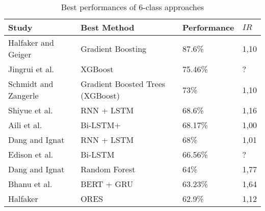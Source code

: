 \begin{table}[ht]
    \caption{Best performances of 6-class approaches}
    \label{tab:ml_performance_6class}
    \centering
    \begin{tabular}{l l l l}
        \toprule
        \textbf{Study} & \textbf{Best Method} & \textbf{Performance} & \textbf{$IR$}\\ 
        \midrule
        Halfaker and Geiger~\cite{Halfaker2020_lr1055} & Gradient Boosting & 87.6\% & 1,10 \\
        Jingrui et al.~\cite{Hou2021_lr122} & XGBoost & 75.46\% & ? \\
        Schmidt and Zangerle~\cite{Schmidt2019_lr78} & Gradient Boosted Trees (XGBoost) & 73\% & 1,10 \\
        Shiyue et al.~\cite{Zhang2018_lr41} & RNN + LSTM & 68.6\% & 1,16 \\
        Aili et al.~\cite{Shen2017_lr31} & Bi-LSTM+ & 68.17\% & 1,00 \\
        Dang and Ignat~\cite{Dang2017_lr23} & RNN + LSTM & 68\% & 1,01 \\
        Edison et al.~\cite{Marrese-Taylor2019_lr85} & Bi-LSTM & 66.56\% & ? \\
        Dang and Ignat~\cite{Dang2016_lr16} & Random Forest & 64\% & 1,77 \\
        Bhanu et al.~\cite{Guda2020_lr38} & BERT + GRU & 63.23\% & 1,64 \\
        Halfaker~\cite{Halfaker2017_lr22} & ORES & 62.9\% & 1,12 \\
        \bottomrule
    \end{tabular}
\end{table}